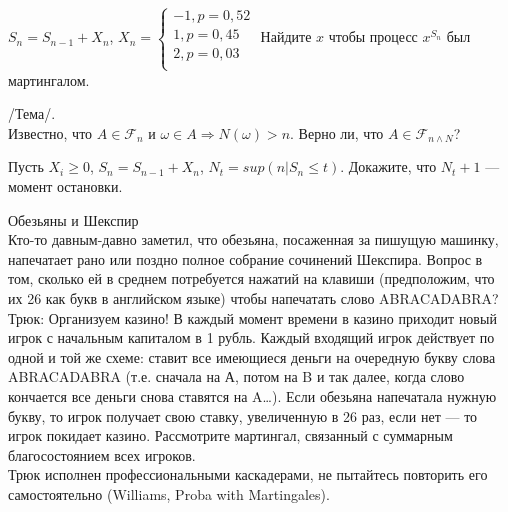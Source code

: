 \begin{problem}
 [Steele, 2.1.]
$S_{n}=S_{n-1}+X_{n}$,
$X_{n}=
\begin{cases}
	-1, p=0,52 \\
	1, p=0,45 \\
	2, p=0,03 \\
\end{cases} $
Найдите $x$ чтобы процесс $x^{S_{n}}$ был мартингалом.

\begin{sol}

\end{sol}
\end{problem}

\begin{problem}
 /Тема/. \\
Известно, что $A\in\mathcal{F}_{n}$ и $\omega\in A \Rightarrow
N(\omega)>n$. Верно ли, что $A \in \mathcal{F}_{n\wedge N}$?

\begin{sol}

\end{sol}
\end{problem}

\begin{problem}
Пусть $X_{i}\ge 0$, $S_{n}=S_{n-1}+X_{n}$, $N_{t}=sup(n|S_{n}\le
t)$. Докажите, что $N_{t}+1$ — момент остановки.

\begin{sol}

\end{sol}
\end{problem}

\begin{problem}
 Обезьяны и Шекспир \\
Кто-то давным-давно заметил, что обезьяна, посаженная за
пишущую машинку, напечатает рано или поздно полное собрание
сочинений Шекспира. Вопрос в том, сколько ей в
среднем потребуется нажатий на клавиши (предположим, что их 26 как
букв в
английском языке) чтобы напечатать слово ABRACADABRA? \\
Трюк: Организуем казино! В каждый момент времени в казино приходит
новый игрок с начальным капиталом в 1 рубль. Каждый входящий игрок
действует по одной и той же схеме: ставит все имеющиеся деньги на
очередную букву слова ABRACADABRA (т.е. сначала на А, потом на B и
так далее, когда слово кончается все деньги снова ставятся на A\ldots).
Если обезьяна напечатала нужную букву, то игрок получает свою
ставку, увеличенную в 26 раз, если нет — то игрок покидает казино.
Рассмотрите мартингал, связанный с суммарным благосостоянием всех
игроков. \\
Трюк исполнен профессиональными каскадерами, не пытайтесь
повторить его самостоятельно (Williams, Proba with Martingales).

\begin{sol}

\end{sol}
\end{problem}


